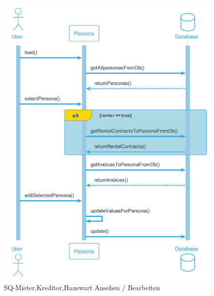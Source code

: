\begin{figure}[H]
  \begin{center}
    \includegraphics[width=0.7\textheight]{content/diagrams/out/sequenzdiagram/personAnsehen/personAnsehen.png}
    \caption{SQ-Mieter,Kreditor,Hauswart Ansehen / Bearbeiten}
    \label{sqPersonaEdit}
  \end{center}
\end{figure}

